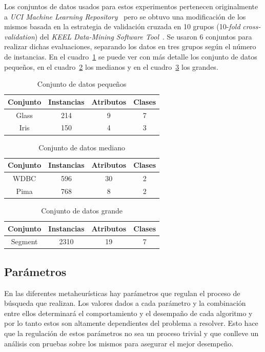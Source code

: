 \documentclass{ci5652}
\begin{document}
Los conjuntos de datos usados para estos experimentos pertenecen originalmente a \textit{UCI Machine Learning Repository}~\cite{Lichman:2013} pero se obtuvo una modificación de los mismos basada en la estrategia de validación cruzada en 10 grupos (10-\textit{fold} \textit{cross-validation}) del \textit{KEEL Data-Mining Software Tool}~\cite{alcala2010keel}. Se usaron 6 conjuntos para realizar dichas evaluaciones, separando los datos en tres grupos según el número de instancias. En el cuadro~\ref{table:small-dataset} se puede ver con más detalle los conjunto de datos pequeños, en el cuadro~\ref{table:medium-dataset} los medianos y en el cuadro~\ref{table:large-dataset} los grandes.

\begin{table}[!h]
	\centering
	\begin{tabular}{c c c c}
	\hline
	Conjunto & Instancias & Atributos & Clases \\
	\hline
	Glass & 214 & 9 & 7 \\
	Iris & 150 & 4 & 3 \\
	\end{tabular}
	\caption{Conjunto de datos pequeños}
	\label{table:small-dataset}
\end{table}

\begin{table}[!h]
	\centering
	\begin{tabular}{c c c c}
	\hline
	Conjunto & Instancias & Atributos & Clases \\
	\hline
	WDBC & 596 & 30 & 2 \\
	Pima & 768 & 8 & 2 \\
	\end{tabular}
	\caption{Conjunto de datos mediano}
	\label{table:medium-dataset}
\end{table}


\begin{table}[!h]
	\centering
	\begin{tabular}{c c c c}
	\hline
	Conjunto & Instancias & Atributos & Clases \\
	\hline
	Segment & 2310 & 19 & 7 \\
	\end{tabular}
	\caption{Conjunto de datos grande}
	\label{table:large-dataset}
\end{table}

\subsection{Parámetros}
En las diferentes metaheurísticas hay parámetros que regulan el proceso de búsqueda que realizan. Los valores dados a cada parámetro y la combinación entre ellos determinará el comportamiento y el desempaño de cada algoritmo y por lo tanto estos son altamente dependientes del problema a resolver. Esto hace que la regulación de estos parámetros no sea un proceso trivial y que conlleve un análisis con pruebas sobre los mismos para asegurar el mejor desempeño.
\end{document}
